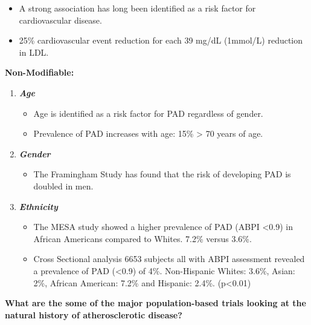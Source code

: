 \documentclass[
]{book}
\providecommand{\tightlist}{%
  \setlength{\itemsep}{0pt}\setlength{\parskip}{0pt}}
\begin{document}
\begin{enumerate}
  \begin{itemize}
  \item
    A strong association has long been identified as a risk factor
    for cardiovascular disease.
  \item
    25\% cardiovascular event reduction for each 39 mg/dL (1mmol/L)
    reduction in LDL.
    \citep{heartprotectionstudycollaborativegroupRandomizedTrialEffects2007}
  \end{itemize}
\end{enumerate}

\textbf{Non-Modifiable:}

\begin{enumerate}
\def\labelenumi{\arabic{enumi}.}
\item
  \textbf{\emph{Age}}

  \begin{itemize}
  \item
    Age is identified as a risk factor for PAD regardless of gender.
  \item
    Prevalence of PAD increases with age: 15\% \textgreater{} 70 years of age.
  \end{itemize}
\item
  \textbf{\emph{Gender}}

  \begin{itemize}
  \tightlist
  \item
    The Framingham Study has found that the risk of developing PAD
    is doubled in men.
  \end{itemize}
\item
  \textbf{\emph{Ethnicity}}

  \begin{itemize}
  \item
    The MESA study showed a higher prevalence of PAD (ABPI \textless0.9) in
    African Americans compared to Whites. 7.2\% versus 3.6\%.
    \citep{bildMultiEthnicStudyAtherosclerosis2002}
  \item
    Cross Sectional analysis 6653 subjects all with ABPI assessment
    revealed a prevalence of PAD (\textless0.9) of 4\%. Non-Hispanic Whites:
    3.6\%, Asian: 2\%, African American: 7.2\% and Hispanic: 2.4\%.
    (p\textless0.01) \citep{allisonEffectNovelCardiovascular2006}
  \end{itemize}
\end{enumerate}

\textbf{What are the some of the major population-based trials looking at the
natural history of atherosclerotic disease?}
\end{document}
